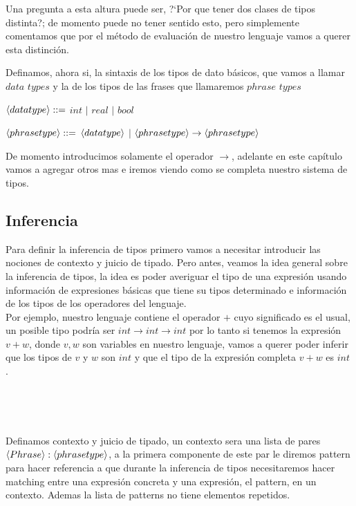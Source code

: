 Una pregunta a esta altura puede ser, ?`Por que tener dos clases de tipos 
distinta?; de momento puede no tener sentido esto, pero simplemente
comentamos que por el m\'etodo de evaluaci\'on de nuestro lenguaje
vamos a querer esta distinci\'on.\

Definamos, ahora si, la sintaxis de los tipos de dato b\'asicos, 
que vamos a llamar $data$ $types$ y la de los tipos de las frases que
llamaremos $phrase$ $types$ 

\begin{center} $\langle data type \rangle ::=$ $int$ $|$ $real$ $|$ $bool$ \end{center}

\begin{center} 

$\langle phrase type \rangle::=$ $\langle data type \rangle$ $|$ $\langle phrase type \rangle \rightarrow \langle phrase type \rangle$

\end{center}

De momento introducimos solamente el operador $\rightarrow$, adelante en este 
cap\'itulo vamos a agregar otros mas e iremos viendo como se completa nuestro
sistema de tipos.\

\subsection{Inferencia}
Para definir la inferencia de tipos primero vamos a necesitar introducir las 
nociones de contexto y juicio de tipado. Pero antes, veamos la idea general
sobre la inferencia de tipos, la idea es poder averiguar el tipo de una expresi\'on
usando informaci\'on de expresiones b\'asicas que tiene su tipos determinado e
informaci\'on de los tipos de los operadores del lenguaje.\\
Por ejemplo, nuestro lenguaje contiene el operador $+$ cuyo significado
es el usual, un posible tipo podr\'ia ser $int \rightarrow int \rightarrow int$
por lo tanto si tenemos la expresi\'on $v + w$, donde $v,w$ son variables en
nuestro lenguaje, vamos a querer poder inferir que los tipos de $v$ y $w$ son
$int$ y que el tipo de la expresi\'on completa $v + w$ es $int$.\

\

\

\noindent Definamos contexto y juicio de tipado, un contexto sera una lista de 
pares $\langle Phrase \rangle:\langle phrase type \rangle$, a la primera componente de este 
par le diremos pattern para hacer referencia a que durante la inferencia de tipos
necesitaremos hacer matching entre una expresi\'on concreta y una expresi\'on, el
pattern, en un contexto. Ademas la lista de patterns no tiene elementos repetidos.

